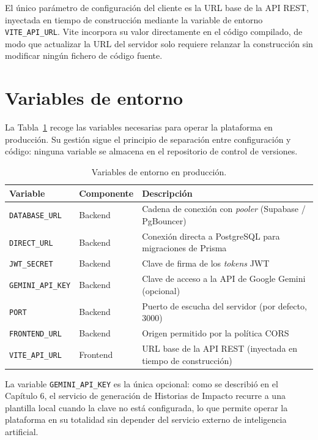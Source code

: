 \documentclass[11pt,oneside,spanish,listoffigures,listoftables]{tfgetsinf}
\begin{document}
El único parámetro de configuración del cliente es la URL base de la API REST, inyectada en tiempo de construcción mediante la variable de entorno \texttt{VITE\_API\_URL}. Vite incorpora su valor directamente en el código compilado, de modo que actualizar la URL del servidor solo requiere relanzar la construcción sin modificar ningún fichero de código fuente.

\section{Variables de entorno}

La Tabla~\ref{tab:env-vars} recoge las variables necesarias para operar la plataforma en producción. Su gestión sigue el principio de separación entre configuración y código: ninguna variable se almacena en el repositorio de control de versiones.

\begin{table}[ht]
\centering
\caption[Variables de entorno en producción]{Variables de entorno en producción.}
\label{tab:env-vars}
\footnotesize
\renewcommand{\arraystretch}{1.3}
\begin{tabularx}{\textwidth}{%
  >{\raggedright\arraybackslash}p{3.6cm}%
  >{\raggedright\arraybackslash}p{2.0cm}%
  >{\raggedright\arraybackslash}X}
\toprule
\textbf{Variable} & \textbf{Componente} & \textbf{Descripción} \\
\midrule
\texttt{DATABASE\_URL}    & Backend  & Cadena de conexión con \textit{pooler} (Supabase / PgBouncer) \\
\texttt{DIRECT\_URL}      & Backend  & Conexión directa a PostgreSQL para migraciones de Prisma \\
\texttt{JWT\_SECRET}      & Backend  & Clave de firma de los \textit{tokens} JWT \\
\texttt{GEMINI\_API\_KEY} & Backend  & Clave de acceso a la API de Google Gemini (opcional) \\
\texttt{PORT}             & Backend  & Puerto de escucha del servidor (por defecto, 3000) \\
\texttt{FRONTEND\_URL}    & Backend  & Origen permitido por la política CORS \\
\texttt{VITE\_API\_URL}   & Frontend & URL base de la API REST (inyectada en tiempo de construcción) \\
\bottomrule
\end{tabularx}
\end{table}

La variable \texttt{GEMINI\_API\_KEY} es la única opcional: como se describió en el Capítulo 6, el servicio de generación de Historias de Impacto recurre a una plantilla local cuando la clave no está configurada, lo que permite operar la plataforma en su totalidad sin depender del servicio externo de inteligencia artificial.
\end{document}
